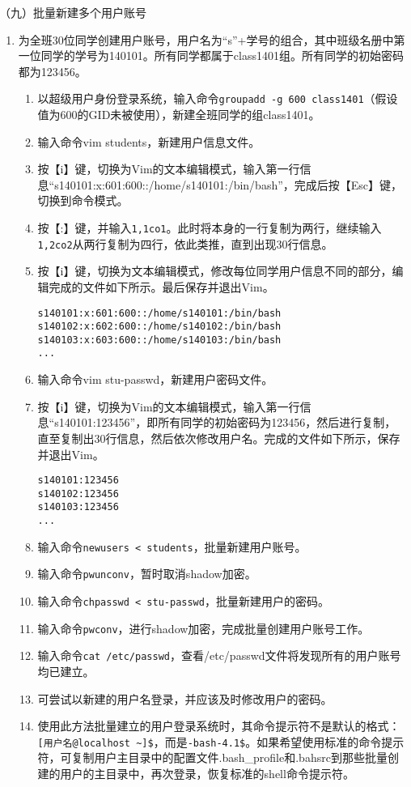 \vspace{0.1in}
（九）批量新建多个用户账号
\begin{enumerate}
  \item 为全班30位同学创建用户账号，用户名为“s”+学号的组合，其中班级名册中第一位同学的学号为140101。所有同学都属于class1401组。所有同学的初始密码都为123456。
    \begin{enumerate}
      \item 以超级用户身份登录系统，输入命令\verb|groupadd -g 600 class1401|（假设值为600的GID未被使用），新建全班同学的组class1401。
      \item 输入命令vim students，新建用户信息文件。
      \item 按【i】键，切换为Vim的文本编辑模式，输入第一行信息“s140101:x:601:600::/home/s140101:/bin/bash”，完成后按【Esc】键，切换到命令模式。
      \item 按【:】键，并输入\verb|1,1co1|。此时将本身的一行复制为两行，继续输入\verb|1,2co2|从两行复制为四行，依此类推，直到出现30行信息。
      \item 按【i】键，切换为文本编辑模式，修改每位同学用户信息不同的部分，编辑完成的文件如下所示。最后保存并退出Vim。
\begin{verbatim}
s140101:x:601:600::/home/s140101:/bin/bash
s140102:x:602:600::/home/s140102:/bin/bash
s140103:x:603:600::/home/s140103:/bin/bash
...
\end{verbatim}
      \item 输入命令vim stu-passwd，新建用户密码文件。
      \item 按【i】键，切换为Vim的文本编辑模式，输入第一行信息“s140101:123456”，即所有同学的初始密码为123456，然后进行复制，直至复制出30行信息，然后依次修改用户名。完成的文件如下所示，保存并退出Vim。
\begin{verbatim}
s140101:123456
s140102:123456
s140103:123456
...
\end{verbatim}
      \item 输入命令\verb|newusers < students|，批量新建用户账号。
      \item 输入命令\verb|pwunconv|，暂时取消shadow加密。
      \item 输入命令\verb|chpasswd < stu-passwd|，批量新建用户的密码。
      \item 输入命令\verb|pwconv|，进行shadow加密，完成批量创建用户账号工作。
      \item 输入命令\verb|cat /etc/passwd|，查看/etc/passwd文件将发现所有的用户账号均已建立。
      \item 可尝试以新建的用户名登录，并应该及时修改用户的密码。
      \item 使用此方法批量建立的用户登录系统时，其命令提示符不是默认的格式：\verb|[用户名@localhost ~]$|，而是\verb|-bash-4.1$|。如果希望使用标准的命令提示符，可复制用户主目录中的配置文件.bash\_profile和.bahsrc到那些批量创建的用户的主目录中，再次登录，恢复标准的shell命令提示符。
    \end{enumerate}
\end{enumerate}

